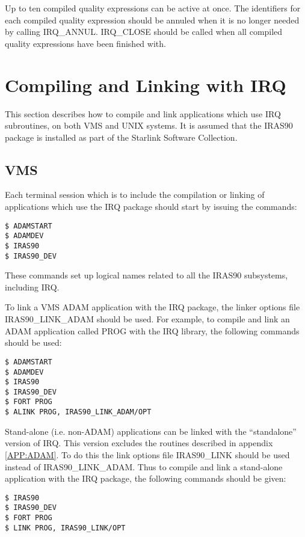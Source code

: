 Up to ten compiled quality expressions can be active at once. The identifiers
for each compiled quality expression should be annuled when it is no longer
needed by calling IRQ\_ANNUL. IRQ\_CLOSE should be called when all compiled 
quality expressions have been finished with. 

\section {Compiling and Linking with IRQ}
\label{SEC:LINK}
This section describes how to compile and link applications which use IRQ
subroutines, on both VMS and UNIX systems. It is assumed that the IRAS90 package
is installed as part of the Starlink Software Collection.

\subsection{VMS}
Each terminal session which is to include the compilation or linking of 
applications which use the IRQ package should start by issuing the commands:

\begin{verbatim}
$ ADAMSTART
$ ADAMDEV
$ IRAS90
$ IRAS90_DEV
\end{verbatim}

These commands set up logical names related to all the IRAS90
subsystems, including IRQ. 

To link a VMS ADAM application with the IRQ package, the linker options file
IRAS90\_LINK\_ADAM should be used. For example, to compile and link an ADAM
application called PROG with the IRQ library, the following commands should be
used: 

\begin{verbatim}
$ ADAMSTART
$ ADAMDEV
$ IRAS90
$ IRAS90_DEV
$ FORT PROG
$ ALINK PROG, IRAS90_LINK_ADAM/OPT 
\end{verbatim}

Stand-alone (i.e. non-ADAM) applications can be linked with the ``standalone''
version of IRQ. This version excludes the routines described in appendix
\ref{APP:ADAM}. To do this the link options file IRAS90\_LINK should be used
instead of IRAS90\_LINK\_ADAM. Thus to compile and link a stand-alone
application with the IRQ package, the following commands should be given: 

\begin{verbatim}
$ IRAS90
$ IRAS90_DEV
$ FORT PROG
$ LINK PROG, IRAS90_LINK/OPT 
\end{verbatim}


